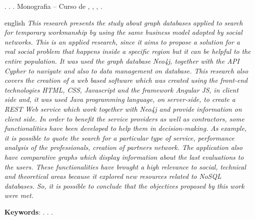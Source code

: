 
\begin{OnehalfSpacing} 

\noindent \imprimirAutorCitacaoMaiuscula. {\bfseries\imprimirtitulo}. {\imprimirdata}.  Monografia -- Curso de {\MakeUppercase\imprimircurso}, {\imprimirinstituicao}, {\imprimirlocal}, {\imprimirdata}.

\vspace{\onelineskip}
\vspace{\onelineskip}
\vspace{\onelineskip}
\vspace{\onelineskip}

\begin{resumo}[Abstract]%
\begin{otherlanguage*}{english}%
\textit{
\noindent This research presents the study about graph databases applied to search for temporary workmanship by using the same business model adopted by social networks. This is an applied research, since it aims to propose a solution for a real social problem that happens inside a specific region but it can be helpful to the entire population. It was used the graph database Neo4j, together with the API Cypher to navigate and also to data management on database. This research also covers the creation of a web based software which was created using the front-end technologies HTML, CSS, Javascript and the framework Angular JS, in client side and, it was used Java programming language, on server-side, to create a REST Web service which work together with Neo4j and provide information on client side. In order to benefit the service providers as well as contractors, some functionalities have been developed to help them in decision-making. As example, it is possible to quote the search for a particular type of service, performance analysis of the professionals, creation of partners network. The application also have comparative graphs which display information about the last evaluations to the users. These functionalities have brought a high relevance to social, technical and theoretical areas because it explored new resources related to NoSQL databases. So, it is possible to conclude that the objectives proposed by this work were met.
}

\vspace{\onelineskip}
\vspace*{\fill}
\noindent \textbf{Keywords}: \imprimirKeyWordOne. \imprimirKeyWordTwo. \imprimirKeyWordThree.
\end{otherlanguage*}
\vspace{\onelineskip}
\end{resumo}

\end{OnehalfSpacing}
